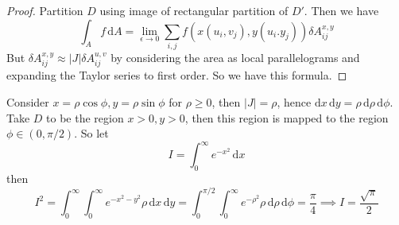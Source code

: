 \begin{proof}
    Partition $D$ using image of rectangular partition of $D'$.
    Then we have
    $$\int_Af\,\mathrm dA=\lim_{\epsilon\to 0}\sum_{i,j}f(x(u_i,v_j),y(u_i.y_j))\delta A_{ij}^{x,y}$$
    But $\delta A_{ij}^{x,y}\approx |J|\delta A_{ij}^{u,v}$ by considering the area as local parallelograms and expanding the Taylor series to first order.
    So we have this formula.
\end{proof}
\begin{example}
    Consider $x=\rho\cos\phi,y=\rho\sin\phi$ for $\rho\ge 0$, then $|J|=\rho$, hence $\mathrm dx\,\mathrm dy=\rho\,\mathrm d\rho\,\mathrm d\phi$.
    Take $D$ to be the region $x>0,y>0$, then this region is mapped to the region $\phi\in (0,\pi/2)$.
    So let
    $$I=\int_0^\infty e^{-x^2}\,\mathrm dx$$
    then
    $$I^2=\int_0^\infty\int_0^\infty e^{-x^2-y^2}\rho\,\mathrm dx\,\mathrm dy=\int_0^{\pi/2}\int_0^\infty e^{-\rho^2}\rho\,\mathrm d\rho\,\mathrm d\phi=\frac{\pi}{4}\implies I=\frac{\sqrt\pi}{2}$$
\end{example}
